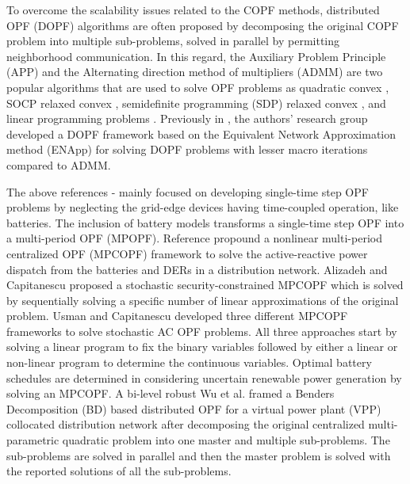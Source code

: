 \documentclass{article}
\begin{document}
To overcome the scalability issues related to the COPF methods, distributed OPF (DOPF) algorithms are often proposed by decomposing the original COPF problem into multiple sub-problems, solved in parallel by permitting neighborhood communication. In this regard, the Auxiliary Problem Principle (APP) and the Alternating direction method of multipliers (ADMM) are two popular algorithms that are used to solve OPF problems as quadratic convex \cite{Fazio}, SOCP relaxed convex \cite{Zheng}, semidefinite programming (SDP) relaxed convex \cite{Wang, Biswas}, and linear programming problems \cite{Paul2}. Previously in \cite{Sadnan}, the authors' research group developed a DOPF framework based on the Equivalent Network Approximation method (ENApp) for solving DOPF problems with lesser macro iterations compared to ADMM.



The above references \cite{Wei}-\cite{Paul2} mainly focused on developing single-time step OPF problems by neglecting the grid-edge devices having time-coupled operation, like batteries. The inclusion of battery models transforms a single-time step OPF into a multi-period OPF (MPOPF). Reference \cite{Gabash} propound a nonlinear multi-period centralized OPF (MPCOPF) framework to solve the active-reactive power dispatch from the batteries and DERs in a distribution network. Alizadeh and Capitanescu \cite{Alizadeh} proposed a stochastic security-constrained MPCOPF which is solved by sequentially solving a specific number of linear approximations of the original problem. Usman and Capitanescu \cite{Usman} developed three different MPCOPF frameworks to solve stochastic AC OPF problems. All three approaches start by solving a linear program to fix the binary variables followed by either a linear or non-linear program to determine the continuous variables. Optimal battery schedules are determined in \cite{Aghdam, Fan} considering uncertain renewable power generation by solving an MPCOPF.  A bi-level robust Wu et al. \cite{Wu} framed a Benders Decomposition (BD) based distributed OPF for a virtual power plant (VPP) collocated distribution network after decomposing the original centralized multi-parametric quadratic problem into one master and multiple sub-problems. The sub-problems are solved in parallel and then the master problem is solved with the reported solutions of all the sub-problems. 
\end{document}
